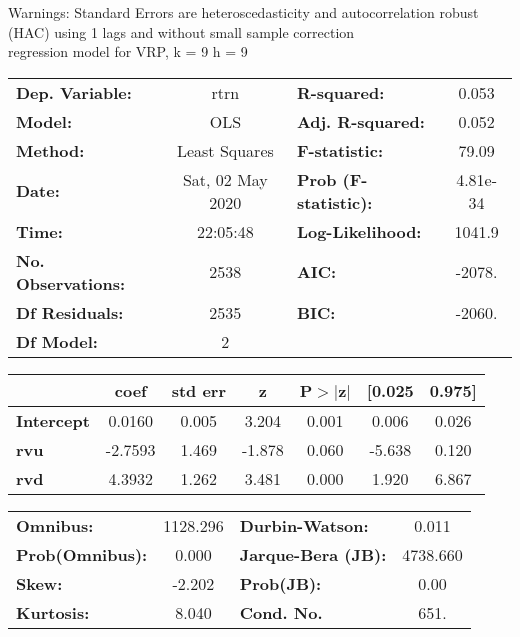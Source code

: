 Warnings: \newline
 [1] Standard Errors are heteroscedasticity and autocorrelation robust (HAC) using 1 lags and without small sample correction\\ 

regression model for VRP, k = 9 h = 9\begin{center}
\begin{tabular}{lclc}
\toprule
\textbf{Dep. Variable:}    &       rtrn       & \textbf{  R-squared:         } &     0.053   \\
\textbf{Model:}            &       OLS        & \textbf{  Adj. R-squared:    } &     0.052   \\
\textbf{Method:}           &  Least Squares   & \textbf{  F-statistic:       } &     79.09   \\
\textbf{Date:}             & Sat, 02 May 2020 & \textbf{  Prob (F-statistic):} &  4.81e-34   \\
\textbf{Time:}             &     22:05:48     & \textbf{  Log-Likelihood:    } &    1041.9   \\
\textbf{No. Observations:} &        2538      & \textbf{  AIC:               } &    -2078.   \\
\textbf{Df Residuals:}     &        2535      & \textbf{  BIC:               } &    -2060.   \\
\textbf{Df Model:}         &           2      & \textbf{                     } &             \\
\bottomrule
\end{tabular}
\begin{tabular}{lcccccc}
                   & \textbf{coef} & \textbf{std err} & \textbf{z} & \textbf{P$> |$z$|$} & \textbf{[0.025} & \textbf{0.975]}  \\
\midrule
\textbf{Intercept} &       0.0160  &        0.005     &     3.204  &         0.001        &        0.006    &        0.026     \\
\textbf{rvu}       &      -2.7593  &        1.469     &    -1.878  &         0.060        &       -5.638    &        0.120     \\
\textbf{rvd}       &       4.3932  &        1.262     &     3.481  &         0.000        &        1.920    &        6.867     \\
\bottomrule
\end{tabular}
\begin{tabular}{lclc}
\textbf{Omnibus:}       & 1128.296 & \textbf{  Durbin-Watson:     } &    0.011  \\
\textbf{Prob(Omnibus):} &   0.000  & \textbf{  Jarque-Bera (JB):  } & 4738.660  \\
\textbf{Skew:}          &  -2.202  & \textbf{  Prob(JB):          } &     0.00  \\
\textbf{Kurtosis:}      &   8.040  & \textbf{  Cond. No.          } &     651.  \\
\bottomrule
\end{tabular}
\end{center}

